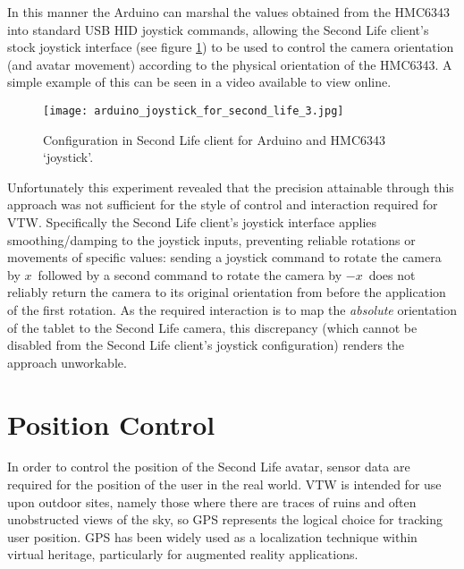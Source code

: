 
In this manner the Arduino can marshal the values obtained from the HMC6343 into standard USB HID joystick commands, allowing the Second Life client's stock joystick interface (see figure \ref{arduino_joystick_for_second_life_3.jpg}) to be used to control the camera orientation (and avatar movement) according to the physical orientation of the HMC6343. A simple example of this can be seen in a video available to view online\ArduinoJoystickVideoFootnote{}.

\begin{figure}[h]
\centering
  \texttt{[image: arduino\_joystick\_for\_second\_life\_3.jpg]}
  \caption{Configuration in Second Life client for Arduino and HMC6343 `joystick'.}
  \label{arduino_joystick_for_second_life_3.jpg}
\end{figure}

Unfortunately this experiment revealed that the precision attainable through this approach was not sufficient for the style of control and interaction required for VTW. Specifically the Second Life client's joystick interface applies smoothing/damping to the joystick inputs, preventing reliable rotations or movements of specific values: sending a joystick command to rotate the camera by $x$\textdegree\ followed by a second command to rotate the camera by $-x$\textdegree\ does not reliably return the camera to its original orientation from before the application of the first rotation. As the required interaction is to map the \textit{absolute} orientation of the tablet to the Second Life camera, this discrepancy (which cannot be disabled from the Second Life client's joystick configuration) renders the approach unworkable.


\section{Position Control}
\label{second_life_position_control}

In order to control the position of the Second Life avatar, sensor data are required for the position of the user in the real world. VTW is intended for use upon outdoor sites, namely those where there are traces of ruins and often unobstructed views of the sky, so GPS represents the logical choice for tracking user position. GPS has been widely used as a localization technique within virtual heritage, particularly for augmented reality applications.

